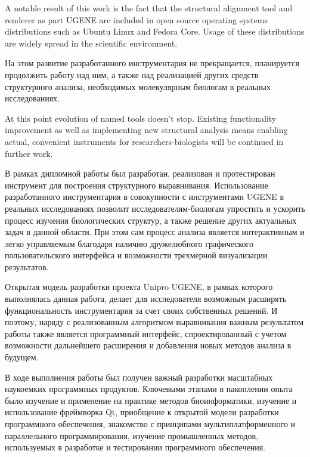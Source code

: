 \documentclass[a4paper, 12pt, titlepage, utf8]{extarticle}
\begin{document}
\begin{original}
\begin{original}
A notable result of this work is the fact that the structural alignment tool and
renderer as part UGENE are included in open source operating systems
distributions such as Ubuntu Linux and Fedora Core. Usage of these distributions
are widely spread in the scientific environment.

\begin{original}
На этом развитие разработанного инструментария не прекращается, планируется
продолжить работу над ним, а также над реализацией других средств структурного
анализа, необходимых молекулярным биологам в реальных исследованиях.
\end{original}

At this point evolution of named tools doesn't stop. Existing functionality
improvement as well as implementing new structural analysis means enabling
actual, convenient instruments for researchers-biologists will be continued in
further work.


\begin{original}
В рамках дипломной работы был разработан, реализован и протестирован инструмент
для построения структурного выравнивания. Использование разработанного
инструментария в совокупности с инструментами UGENE в реальных исследованиях
позволит исследователям-биологам упростить и ускорить процесс изучения
биологических структур, а также решение других актуальных задач в данной
области. При этом сам процесс анализа является интерактивным и легко управляемым
благодаря наличию дружелюбного графического пользовательского интерфейса и
возможности трехмерной визуализации результатов.

Открытая модель разработки проекта Unipro UGENE, в рамках которого выполнялась
данная работа, делает для исследователя возможным расширять функциональность
инструментария за счет своих собственных решений. И поэтому, наряду с
реализованным алгоритмом выравнивания важным результатом работы также является
программный интерфейс, спроектированный с учетом возможности дальнейшего
расширения и добавления новых методов анализа в будущем.

В ходе выполнения работы был получен важный разработки масштабных наукоемких
программных продуктов. Ключевыми этапами в накоплении опыта было изучение и
применение на практике методов биоинформатики, изучение и использование
фреймворка Qt, приобщение к открытой модели разработки программного обеспечения,
знакомство с принципами мультиплатформенного и параллельного программирования,
изучение промышленных методов, используемых в разработке и тестировании
программного обеспечения.


\end{original}
\end{original}
\end{original}
\end{document}
